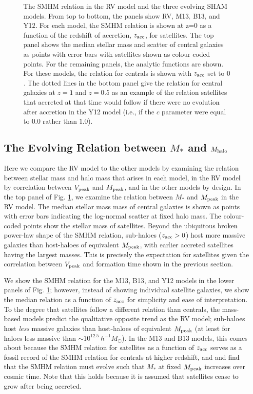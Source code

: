 \documentclass[useAMS,fleqn,usenatbib]{mnras}
\begin{document}
\begin{figure}
    \caption{The SMHM relation in the RV model and the three evolving SHAM models.  From top to bottom, the panels show RV, M13, B13, and Y12.  For each model, the SMHM relation is shown at z=0 as a function of the redshift of accretion, $z_{\rm acc}$, for satellites.  The top panel shows the median stellar mass and scatter of central galaxies as points with error bars with satellites shown as colour-coded points.  For the remaining panels, the analytic functions are shown. For these models, the relation for centrals is shown with $z_{\rm acc}$ set to $0$.  The dotted lines in the bottom panel give the relation for central galaxies at $z=1$ and $z=0.5$ as an example of the relation satellites that accreted at that time would follow if there were no evolution after accretion in the Y12 model (i.e., if the $c$ parameter
were equal to $0.0$ rather than $1.0$).}
    \label{fig:SMHM_comparison}
\end{figure}


\subsection{The Evolving Relation between $M_*$ and $M_{\rm halo}$}
\label{sec:rv_sm_evolv}

Here we compare the RV model to the other models by examining the relation between stellar mass and halo mass that arises in each model, in the RV model by correlation between $V_{\rm peak}$ and $M_{\rm peak}$, and in the other models by design.  In the top panel of Fig. \ref{fig:SMHM_comparison}, we examine the relation between $M_*$ and $M_{\rm peak}$ in the RV model.  The median stellar mass mass of central galaxies is shown as points with error bars indicating the log-normal scatter at fixed halo mass.  The colour-coded points show the stellar mass of satellites.  Beyond the ubiquitous broken power-law shape of the SMHM relation, sub-haloes ($z_{\rm acc}>0$) host more massive galaxies than host-haloes of equivalent $M_{\rm peak}$, with earlier accreted satellites having the largest masses.  This is precisely the expectation for satellites given the correlation between $V_{\rm peak}$ and formation time shown in the previous section.

We show the SMHM relation for the M13, B13, and Y12 models in the lower panels of Fig. \ref{fig:SMHM_comparison}; however, instead of showing individual satellite galaxies, we show the median relation as a function of $z_{\rm acc}$ for simplicity and ease of interpretation.  To the degree that satellites follow a different relation than centrals, the mass-based models predict the qualitative opposite trend as the RV model; sub-haloes host {\em less} massive galaxies than host-haloes of equivalent $M_{\rm peak}$ (at least for haloes less massive than $\sim 10^{12.5} ~ h^{-1} M_{\odot}$).  In the M13 and B13 models, this comes about because the SMHM relation for satellites as a function of $z_{\rm acc}$ serves as a fossil record of the SMHM relation for centrals at higher redshift, and \citet{Moster:2013ab} and \citet{Behroozi:2013fg} find that the SMHM relation must evolve such that $M_*$ at fixed $M_{\rm peak}$ increases over cosmic time. Note that this holds because it is assumed that satellites cease to grow after being accreted. 
\end{document}

